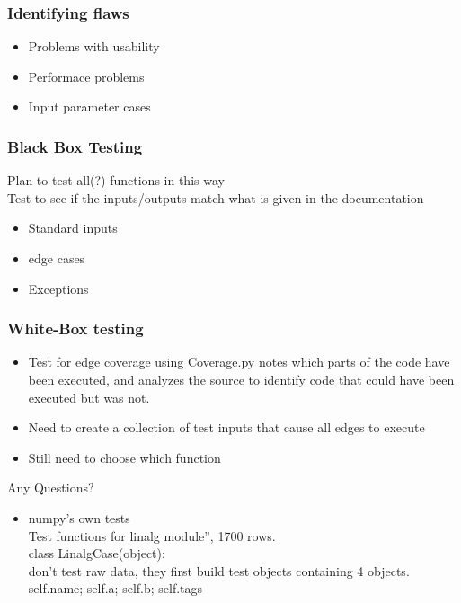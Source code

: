 \documentclass{beamer}
\begin{document}
\begin{frame}\frametitle{Identifying flaws} 
\begin{itemize}
\item Problems with usability
\item Performace problems
\item Input parameter cases
\end{itemize}
\end{frame}

\begin{frame}\frametitle{Black Box Testing} 
Plan to test all(?) functions in this way\\
Test to see if the inputs/outputs match what is given in the documentation
\begin{itemize}
\item Standard inputs
\item edge cases
\item Exceptions 

\end{itemize}
\end{frame}

\begin{frame}\frametitle{White-Box testing} 
\begin{itemize}
\item Test for edge coverage using Coverage.py
 notes which parts of the code have been executed, and analyzes the source to identify code that could have been executed but was not.
\item Need to create a collection of test inputs that cause all edges to execute
\item Still need to choose which function
\end{itemize}
\end{frame}

\begin{frame}
Any Questions?
\end{frame}

\begin{frame}
\begin{itemize}
\item numpy’s own tests
\\ Test functions for linalg module”, 1700 rows. 
\\ class LinalgCase(object):
\\ don’t test raw data, they first build test objects containing 4 objects. 
\\ self.name; self.a; self.b; self.tags  
\end{itemize}
\end{frame}
\end{document}
